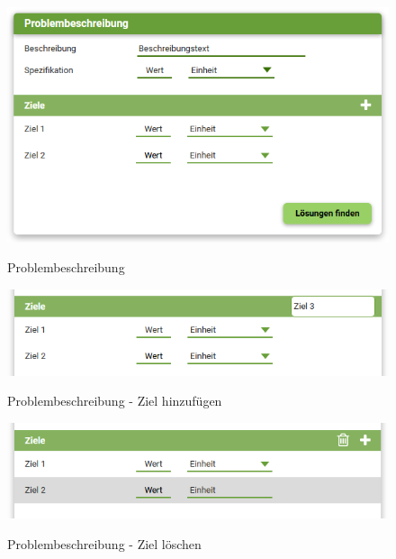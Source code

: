\begin{figure}[htbp]
\centering
\includegraphics[scale=0.7]{DA_files/Bilder/Konzept/Skizze-Problem-1.png}
\label{pic:pD-Problembeschreibung}
\caption{Problembeschreibung}
\end{figure}

\begin{figure}[htbp]
\centering
\includegraphics[scale=0.7]{DA_files/Bilder/Konzept/Skizze-Problem-3.png}
\label{pic:pD-Problembeschreibung-Ziel-hinzufuegen}
\caption{Problembeschreibung - Ziel hinzufügen}
\end{figure}

\begin{figure}[htbp]
\centering
\includegraphics[scale=0.7]{DA_files/Bilder/Konzept/Skizze-Problem-2.png}
\label{pic:pD-Problembeschreibung-Ziel-loeschen}
\caption{Problembeschreibung - Ziel löschen}
\end{figure}

